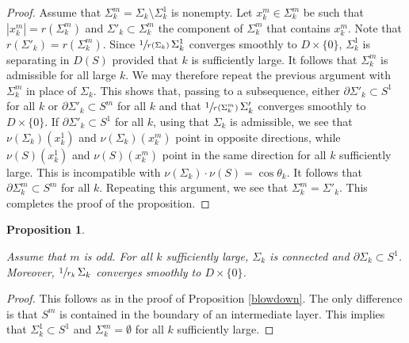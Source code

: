 \documentclass[11pt]{amsart}
\newtheorem{prop}{Proposition}
\begin{document}
\begin{proof}
	Assume that $\Sigma^m_k=\Sigma_k\setminus \Sigma^1_k$ is nonempty. Let $x^m_k\in \Sigma^{m}_k$ be such that $|x^m_k|=r(\Sigma^m_k)$ and $\Sigma'_k\subset \Sigma^m_k$ the component of $\Sigma^m_k$ that contains $x^m_k$. Note that $r(\Sigma'_k)=r(\Sigma^m_k)$. 
	Since $\sfrac{1}{r(\Sigma_k)}\,\Sigma^1_k$ converges smoothly to $D\times \{0\}$, $\Sigma^1_k$ is separating in $D(S)$ provided that $k$ is sufficiently large. It follows that $\Sigma^m_k$ is  admissible for all large $k$. We may therefore repeat the previous argument with $\Sigma^m_k$ in place of $\Sigma_k$. This shows that, passing to a subsequence, either $\partial  \Sigma'_k\subset S^1$ for all $k$ or $\partial  \Sigma'_k\subset S^m$ for all $k$ and that $\sfrac{1}{r(\Sigma^m_k)}\,\Sigma'_k$ converges smoothly to $D\times \{0\}$. If $\partial \Sigma'_k \subset S^1$ for all $k$, using that $\Sigma_k$ is admissible, we see that  $\nu(\Sigma_k)(x^{1}_k)$ and $\nu(\Sigma_k)(x^{m}_k)$ point in opposite directions, while $\nu(S)(x^{1}_k)$ and $\nu(S)(x^{m}_k)$ point in the same direction for all $k$ sufficiently large. This is incompatible with $\nu(\Sigma_k)\cdot \nu(S)=\cos\theta_k$.  It follows that $\partial  \Sigma^m_k\subset S^m$ for all $k$. Repeating this argument, we see that $ \Sigma^m_k=\Sigma'_k$. This completes the proof of the proposition. 
\end{proof}
\begin{prop} \label{blowdown odd}
	
	Assume that $m$ is odd. For all $k$ sufficiently large, $\Sigma_k$ is connected and $\partial \Sigma_k\subset S^1$. Moreover, $\sfrac{1}{r_k}\,\Sigma_k$ converges smoothly to $D\times \{0\}$.
	
	
	
	
	
	
\end{prop} 
\begin{proof}
This follows  as in the proof of Proposition \ref{blowdown}. The only difference is that $S^m$ is  contained in  the boundary of an intermediate layer. This implies that $\Sigma^1_k\subset S^1$ and  $\Sigma^m_k=\emptyset$ for all $k$ sufficiently large.	 
\end{proof} 
\end{document}
